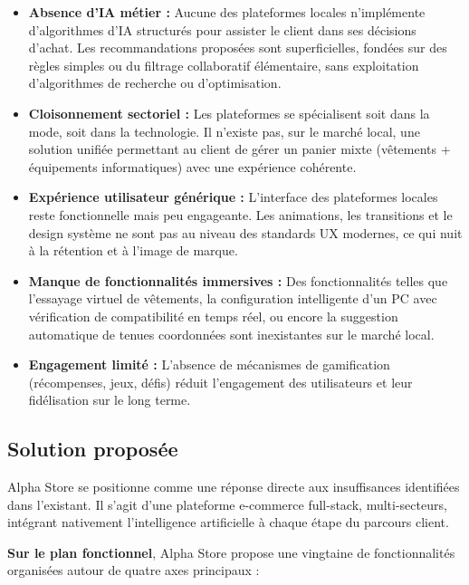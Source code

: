 \begin{itemize}[label=$\bullet$]
    \item \textbf{Absence d'IA métier :} Aucune des plateformes locales n'implémente d'algorithmes d'IA structurés pour assister le client dans ses décisions d'achat. Les recommandations proposées sont superficielles, fondées sur des règles simples ou du filtrage collaboratif élémentaire, sans exploitation d'algorithmes de recherche ou d'optimisation.
    \item \textbf{Cloisonnement sectoriel :} Les plateformes se spécialisent soit dans la mode, soit dans la technologie. Il n'existe pas, sur le marché local, une solution unifiée permettant au client de gérer un panier mixte (vêtements + équipements informatiques) avec une expérience cohérente.
    \item \textbf{Expérience utilisateur générique :} L'interface des plateformes locales reste fonctionnelle mais peu engageante. Les animations, les transitions et le design système ne sont pas au niveau des standards UX modernes, ce qui nuit à la rétention et à l'image de marque.
    \item \textbf{Manque de fonctionnalités immersives :} Des fonctionnalités telles que l'essayage virtuel de vêtements, la configuration intelligente d'un PC avec vérification de compatibilité en temps réel, ou encore la suggestion automatique de tenues coordonnées sont inexistantes sur le marché local.
    \item \textbf{Engagement limité :} L'absence de mécanismes de gamification (récompenses, jeux, défis) réduit l'engagement des utilisateurs et leur fidélisation sur le long terme.
\end{itemize}

\subsection{Solution proposée}

Alpha Store se positionne comme une réponse directe aux insuffisances identifiées dans l'existant. Il s'agit d'une plateforme e-commerce full-stack, multi-secteurs, intégrant nativement l'intelligence artificielle à chaque étape du parcours client.

\textbf{Sur le plan fonctionnel}, Alpha Store propose une vingtaine de fonctionnalités organisées autour de quatre axes principaux :

